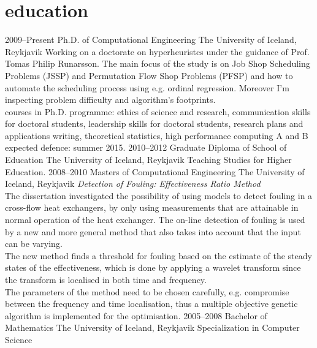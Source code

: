 \documentclass[]{cv} %
\begin{document}
\section{education}
\begin{entrylist}
\entry
{2009--Present}
{Ph.D. {\normalfont of Computational Engineering}}
{The University of Iceland, Reykjavik}
{Working on a doctorate on hyperheuristcs under the guidance of Prof. Tomas Philip Runarsson. The main focus of the study is on Job Shop Scheduling Problems (JSSP) and Permutation Flow Shop Problems (PFSP) and how to automate the scheduling process using e.g. ordinal regression. Moreover I'm inspecting problem difficulty and algorithm's footprints. \\
{\boldfont courses in Ph.D. programme:} 
ethics of science and research, communication skills for doctoral students, leadership skills for doctoral students, research plans and applications writing, theoretical statistics, high performance computing A and B  \\
{\boldfont expected defence:} summer 2015.}
\entry
{2010--2012}
{Graduate Diploma {\normalfont of School of Education}}
{The University of Iceland, Reykjavik}
{Teaching Studies for Higher Education.}
\entry
{2008--2010}
{Masters {\normalfont of Computational Engineering}}
{The University of Iceland, Reykjavik}
{\emph{Detection of Fouling: Effectiveness Ratio Method} \\ 
The dissertation investigated the possibility of using models to detect fouling in a cross-flow heat exchangers, by only using measurements that are attainable in normal operation of the heat exchanger.  The on-line detection of fouling is used by a new and more general method that also takes into account that the input can be varying. \\
The new method finds a threshold for fouling based on the estimate of the steady states of the effectiveness, which is done by applying a wavelet transform since the transform is localised in both time and frequency. \\
The parameters of the method need to be chosen carefully, e.g. compromise between the frequency and time localisation, thus a multiple objective genetic algorithm is implemented for the optimisation. }
\entry
{2005--2008}
{Bachelor {\normalfont of Mathematics}}
{The University of Iceland, Reykjavik}
{Specialization in Computer Science}
\end{entrylist}
\end{document}
